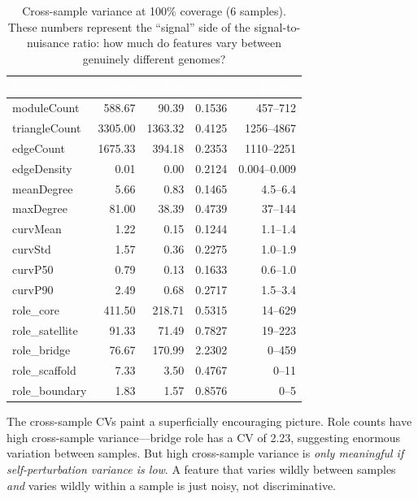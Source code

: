\documentclass{../yalumba}
\begin{document}
\begin{table}[htbp]
\centering
\tablestyle
\caption{Cross-sample variance at 100\% coverage (6 samples).  These
numbers represent the ``signal'' side of the signal-to-nuisance ratio:
how much do features vary between genuinely different genomes?}
\label{tab:cross-sample}
\begin{tabular}{@{}lrrrr@{}}
\toprule
\rowcolor{table-header}
\textcolor{white}{\textbf{Feature}} &
\textcolor{white}{\textbf{Mean}} &
\textcolor{white}{\textbf{Std}} &
\textcolor{white}{\textbf{CV}} &
\textcolor{white}{\textbf{Range}} \\
\midrule
moduleCount     & 588.67 &   90.39 & 0.1536 & 457--712 \\
triangleCount   & 3305.00 & 1363.32 & 0.4125 & 1256--4867 \\
edgeCount       & 1675.33 &  394.18 & 0.2353 & 1110--2251 \\
edgeDensity     &    0.01 &    0.00 & 0.2124 & 0.004--0.009 \\
meanDegree      &    5.66 &    0.83 & 0.1465 & 4.5--6.4 \\
maxDegree       &   81.00 &   38.39 & 0.4739 & 37--144 \\
curvMean        &    1.22 &    0.15 & 0.1244 & 1.1--1.4 \\
curvStd         &    1.57 &    0.36 & 0.2275 & 1.0--1.9 \\
curvP50         &    0.79 &    0.13 & 0.1633 & 0.6--1.0 \\
curvP90         &    2.49 &    0.68 & 0.2717 & 1.5--3.4 \\
role\_core       &  411.50 &  218.71 & 0.5315 & 14--629 \\
role\_satellite  &   91.33 &   71.49 & 0.7827 & 19--223 \\
role\_bridge     &   76.67 &  170.99 & 2.2302 & 0--459 \\
role\_scaffold   &    7.33 &    3.50 & 0.4767 & 0--11 \\
role\_boundary   &    1.83 &    1.57 & 0.8576 & 0--5 \\
\bottomrule
\end{tabular}
\end{table}

The cross-sample CVs paint a superficially encouraging picture.  Role
counts have high cross-sample variance---bridge role has a CV of 2.23,
suggesting enormous variation between samples.  But high cross-sample
variance is \emph{only meaningful if self-perturbation variance is low}.
A feature that varies wildly between samples \emph{and} varies wildly
within a sample is just noisy, not discriminative.
\end{document}
